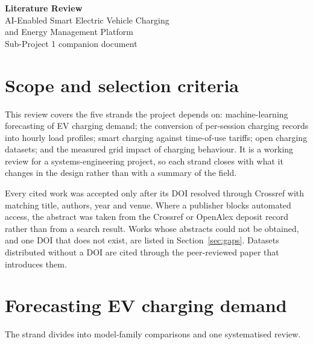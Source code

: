\documentclass[11pt,a4paper]{article}
\begin{document}
\begin{center}
  {\LARGE\bfseries Literature Review}\\[6pt]
  {\large AI-Enabled Smart Electric Vehicle Charging\\[2pt]
   and Energy Management Platform}\\[8pt]
  {\normalsize Sub-Project 1 companion document}
\end{center}

\section{Scope and selection criteria}

This review covers the five strands the project depends on: machine-learning forecasting of EV
charging demand; the conversion of per-session charging records into hourly load profiles; smart
charging against time-of-use tariffs; open charging datasets; and the measured grid impact of
charging behaviour. It is a working review for a systems-engineering project, so each strand closes
with what it changes in the design rather than with a summary of the field.

Every cited work was accepted only after its DOI resolved through Crossref with matching title,
authors, year and venue. Where a publisher blocks automated access, the abstract was taken from the
Crossref or OpenAlex deposit record rather than from a search result. Works whose abstracts could not
be obtained, and one DOI that does not exist, are listed in Section~\ref{sec:gaps}. Datasets
distributed without a DOI are cited through the peer-reviewed paper that introduces them.

\section{Forecasting EV charging demand}\label{sec:forecast}

The strand divides into model-family comparisons and one systematised review.
\end{document}
